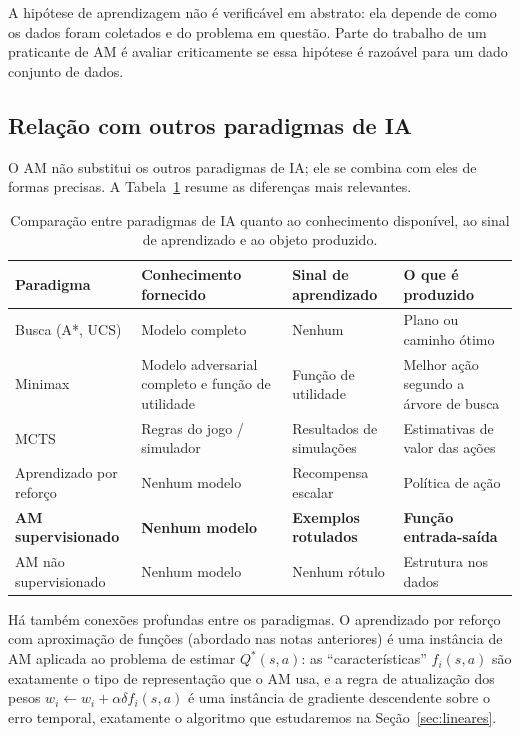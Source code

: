 \documentclass[12pt,a4paper]{article}
\begin{document}
A hipótese de aprendizagem não é verificável em abstrato: ela depende de como os dados foram coletados e do problema em questão. Parte do trabalho de um praticante de AM é avaliar criticamente se essa hipótese é razoável para um dado conjunto de dados.

\subsection{Relação com outros paradigmas de IA}

O AM não substitui os outros paradigmas de IA; ele se combina com eles de formas precisas. A Tabela~\ref{tab:paradigmas-ia} resume as diferenças mais relevantes.

\begin{table}[ht]
\centering
\caption{Comparação entre paradigmas de IA quanto ao conhecimento disponível, ao sinal de aprendizado e ao objeto produzido.}
\label{tab:paradigmas-ia}
\renewcommand{\arraystretch}{1.3}
\begin{tabular}{p{3.0cm}p{3.2cm}p{3.0cm}p{3.8cm}}
\toprule
\textbf{Paradigma} & \textbf{Conhecimento fornecido} & \textbf{Sinal de aprendizado} & \textbf{O que é produzido} \\
\midrule
Busca (A*, UCS) & Modelo completo & Nenhum & Plano ou caminho ótimo \\
\midrule
Minimax & Modelo adversarial completo e função de utilidade & Função de utilidade & Melhor ação segundo a árvore de busca \\
\midrule
MCTS & Regras do jogo / simulador & Resultados de simulações & Estimativas de valor das ações \\
\midrule
Aprendizado por reforço & Nenhum modelo & Recompensa escalar & Política de ação \\
\midrule
\textbf{AM supervisionado} & \textbf{Nenhum modelo} & \textbf{Exemplos rotulados} & \textbf{Função entrada-saída} \\
\midrule
AM não supervisionado & Nenhum modelo & Nenhum rótulo & Estrutura nos dados \\
\bottomrule
\end{tabular}
\end{table}

Há também conexões profundas entre os paradigmas. O aprendizado por reforço com aproximação de funções (abordado nas notas anteriores) é uma instância de AM aplicada ao problema de estimar $Q^*(s,a)$: as ``características'' $f_i(s,a)$ são exatamente o tipo de representação que o AM usa, e a regra de atualização dos pesos $w_i \leftarrow w_i + \alpha \delta f_i(s,a)$ é uma instância de gradiente descendente sobre o erro temporal, exatamente o algoritmo que estudaremos na Seção~\ref{sec:lineares}.
\end{document}
